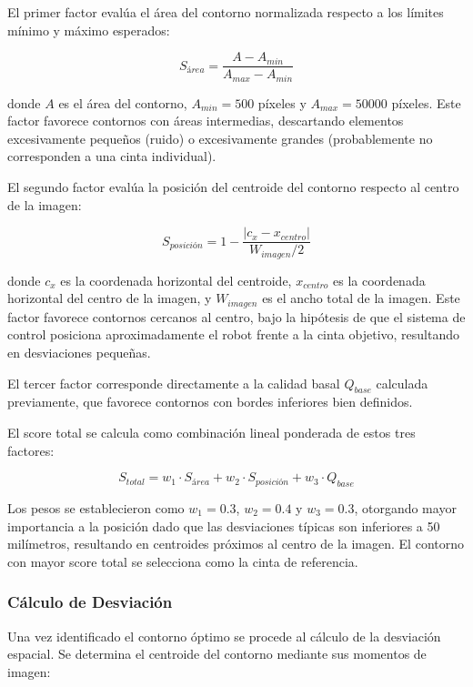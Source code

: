 El primer factor evalúa el área del contorno normalizada respecto a los límites mínimo y máximo esperados:

\begin{equation}
S_{área} = \frac{A - A_{min}}{A_{max} - A_{min}}
\end{equation}

donde $A$ es el área del contorno, $A_{min} = 500$ píxeles y $A_{max} = 50000$ píxeles. Este factor favorece contornos con áreas intermedias, descartando elementos excesivamente pequeños (ruido) o excesivamente grandes (probablemente no corresponden a una cinta individual).

El segundo factor evalúa la posición del centroide del contorno respecto al centro de la imagen:

\begin{equation}
S_{posición} = 1 - \frac{|c_x - x_{centro}|}{W_{imagen}/2}
\end{equation}

donde $c_x$ es la coordenada horizontal del centroide, $x_{centro}$ es la coordenada horizontal del centro de la imagen, y $W_{imagen}$ es el ancho total de la imagen. Este factor favorece contornos cercanos al centro, bajo la hipótesis de que el sistema de control posiciona aproximadamente el robot frente a la cinta objetivo, resultando en desviaciones pequeñas.

El tercer factor corresponde directamente a la calidad basal $Q_{base}$ calculada previamente, que favorece contornos con bordes inferiores bien definidos.

El score total se calcula como combinación lineal ponderada de estos tres factores:

\begin{equation}
S_{total} = w_1 \cdot S_{área} + w_2 \cdot S_{posición} + w_3 \cdot Q_{base}
\end{equation}

Los pesos se establecieron como $w_1 = 0.3$, $w_2 = 0.4$ y $w_3 = 0.3$, otorgando mayor importancia a la posición dado que las desviaciones típicas son inferiores a 50 milímetros, resultando en centroides próximos al centro de la imagen. El contorno con mayor score total se selecciona como la cinta de referencia.

\subsubsection{Cálculo de Desviación}

Una vez identificado el contorno óptimo se procede al cálculo de la desviación espacial. Se determina el centroide del contorno mediante sus momentos de imagen:

